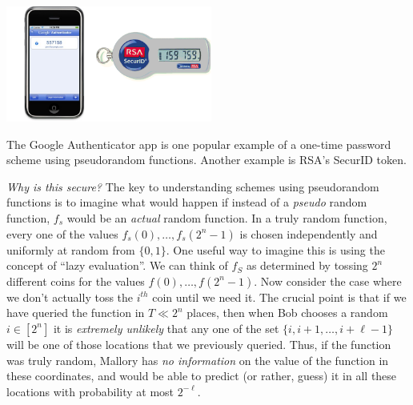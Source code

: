 \begin{marginfigure}
\centering
\includegraphics[width=\linewidth, height=1.5in, keepaspectratio]{../figure/google-authenticator.jpg}
\caption{The Google Authenticator app is one popular example of a
one-time password scheme using pseudorandom functions. Another example
is RSA's SecurID token.}
\label{tmplabelfig}
\end{marginfigure}

\emph{Why is this secure?} The key to understanding schemes using
pseudorandom functions is to imagine what would happen if instead of a
\emph{pseudo} random function, \(f_s\) would be an \emph{actual} random
function. In a truly random function, every one of the values
\(f_s(0),\ldots,f_s(2^n-1)\) is chosen independently and uniformly at
random from \(\{0,1\}\). One useful way to imagine this is using the
concept of ``lazy evaluation''. We can think of \(f_S\) as determined by
tossing \(2^n\) different coins for the values \(f(0),\ldots,f(2^n-1)\).
Now consider the case where we don't actually toss the \(i^{th}\) coin
until we need it. The crucial point is that if we have queried the
function in \(T\ll 2^n\) places, then when Bob chooses a random
\(i\in[2^n]\) it is \emph{extremely unlikely} that any one of the set
\(\{i,i+1,\ldots,i+\ell-1\}\) will be one of those locations that we
previously queried. Thus, if the function was truly random, Mallory has
\emph{no information} on the value of the function in these coordinates,
and would be able to predict (or rather, guess) it in all these
locations with probability at most \(2^{-\ell}\).


\hypertarget{loginprfthm}{}

